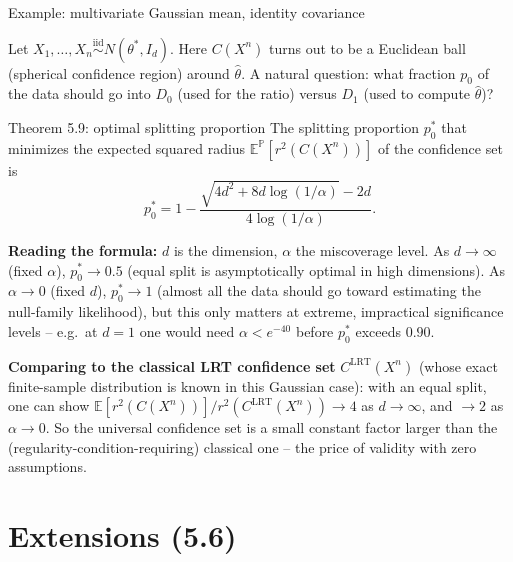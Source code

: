 \documentclass[aspectratio=169,10pt]{beamer}
\renewcommand{\P}{\mathbb{P}}
\newcommand{\E}{\mathbb{E}}
\begin{document}
\begin{frame}{Example: multivariate Gaussian mean, identity covariance}

  Let $X_1,\ldots,X_n \stackrel{\text{iid}}{\sim} N(\theta^*, I_d)$.
  Here $C(X^n)$ turns out to be a Euclidean ball (spherical confidence
  region) around $\hat\theta$. A natural question: what fraction
  $p_0$ of the data should go into $D_0$ (used for the ratio) versus
  $D_1$ (used to compute $\hat\theta$)?

  \begin{alertblock}{Theorem 5.9: optimal splitting proportion}
    The splitting proportion $p_0^*$ that minimizes the expected squared
    radius $\E^\P[r^2(C(X^n))]$ of the confidence set is
    $$ p_0^* = 1 - \frac{\sqrt{4d^2 + 8d\log(1/\alpha)} - 2d}{4\log(1/\alpha)}. $$
  \end{alertblock}

  \textbf{Reading the formula:} $d$ is the dimension, $\alpha$ the
  miscoverage level. As $d\to\infty$ (fixed $\alpha$), $p_0^* \to 0.5$
  (equal split is asymptotically optimal in high dimensions). As
  $\alpha \to 0$ (fixed $d$), $p_0^* \to 1$ (almost all the data should
  go toward estimating the null-family likelihood), but this only
  matters at extreme, impractical significance levels -- e.g.\ at
  $d=1$ one would need $\alpha < e^{-40}$ before $p_0^*$ exceeds $0.90$.

  \textbf{Comparing to the classical LRT confidence set} $C^{\mathrm{LRT}}(X^n)$
  (whose exact finite-sample distribution is known in this Gaussian
  case): with an equal split, one can show
  $\E[r^2(C(X^n))]/r^2(C^{\mathrm{LRT}}(X^n)) \to 4$ as $d\to\infty$,
  and $\to 2$ as $\alpha \to 0$. So the universal confidence set is a
  small constant factor larger than the (regularity-condition-requiring)
  classical one -- the price of validity with zero assumptions.

\end{frame}

\section{Extensions (5.6)}
\end{document}
